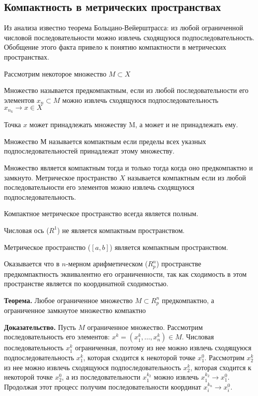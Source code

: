 \documentclass[14pt,a4paper]{extarticle}
\theoremstyle{definition}
\theoremstyle{remark}
\renewcommand{\[}{\begin{dmath*}[compact]}
\renewcommand{\]}{\end{dmath*}}
\newcommand{\tth}[1][]{\textbf{Теорема#1.}}
\newcommand{\btev}[1][]{\textbf{Доказательство#1.}
}
\begin{document}
\subsection{Компактность в метрических пространствах}

Из анализа известно теорема Больцано-Вейерштрасса: из любой ограниченной числовой последовательности можно извлечь сходящуюся подпоследовательность. Обобщение этого факта привело к понятию компактности в метрических пространствах.

Рассмотрим некоторое множество $M\subset X$

Множество называется предкомпактным, если из любой последовательности его элементов ${x_n}\subset M$ можно извлечь сходящуюся подпоследовательность $x_{n_k}\to x\in X$

Точка $x$ может принадлежать множеству M, а может и не принадлежать ему.

Множество $М$ называется компактным если пределы всех указных подпоследовательностей принадлежат этому множеству.

Множество является компактным тогда и только тогда когда оно предкомпактно и замкнуто. Метрическое пространство $X$ называется компактным если из любой последовательности его элементов можно извлечь сходящуюся подпоследовательность.

Компактное метрическое пространство всегда является полным.

Числовая ось ($R^1$) не является компактным пространством.

Метрическое пространство ($[a,b]$) является компактным пространством.

Оказывается что в $n$-мерном арифметическом ($R_p^n$) пространстве предкомпактность эквивалентно его ограниченности, так как сходимость в этом пространстве является по координатной сходимостью.

\tth[] Любое ограниченное множество $M\subset R_p^n$ предкомпактно, а ограниченное замкнутое множество компактно

\btev[] Пусть $M$ ограниченное множество. Рассмотрим последовательность его элементов: $x^k=(x_1^k,\dots,x_n^k)\in M$.
Числовая последовательность $x_1^k$ ограниченная, поэтому из нее можно извлечь сходящуюся подпоследовательность $x_1^k$, которая сходится к некоторой точке $x_1^0$.
Рассмотрим $x_2^k$ из нее можно извлечь сходящуюся подпоследовательность $x_2^k$, которая сходится к некоторой точке $x_2^0$, а из последовательности $x_1^{k_2}$ можно извлечь $x_1^{k_2}\to x_1^0$. Продолжая этот процесс получим последовательности координат $x_i^{k_n}\to x_i^0$.
\end{document}
